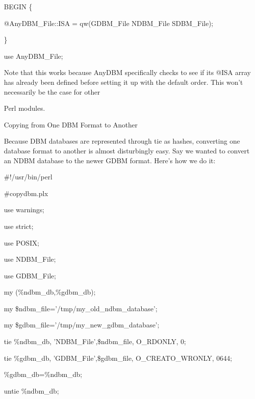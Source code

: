 \documentclass[a4paper,11pt]{book}
\begin{document}
\noindent 

\noindent BEGIN \{

\noindent @AnyDBM\_File::ISA = qw(GDBM\_File NDBM\_File SDBM\_File);

\noindent \}

\noindent use AnyDBM\_File;

\noindent 

\noindent Note that this works because  AnyDBM specifically  checks  to  see  if  its @ISA array  has already  been defined  before  setting  it up with  the  default  order.  This  won't  necessarily  be  the case  for other

\noindent Perl modules.

\noindent 

\noindent Copying from One DBM Format to Another

\noindent 

\noindent Because DBM databases are represented through tie as hashes, converting one database format to another is almost disturbingly easy. Say we wanted to convert an NDBM database to the newer GDBM format. Here's how we do it:

\noindent 

\noindent 

\noindent \#!/usr/bin/perl

\noindent \#copydbm.plx

\noindent use warnings;

\noindent use strict;

\noindent use POSIX;

\noindent use NDBM\_File;

\noindent use GDBM\_File;

\noindent 

\noindent my (\%ndbm\_db,\%gdbm\_db);

\noindent my \$ndbm\_file='/tmp/my\_old\_ndbm\_database';

\noindent my \$gdbm\_file='/tmp/my\_new\_gdbm\_database';

\noindent 

\noindent tie \%ndbm\_db, 'NDBM\_File',\$ndbm\_file, O\_RDONLY, 0;

\noindent tie \%gdbm\_db, 'GDBM\_File',\$gdbm\_file, O\_CREAT\textbar O\_WRONLY, 0644;

\noindent 

\noindent \%gdbm\_db=\%ndbm\_db;

\noindent 

\noindent untie \%ndbm\_db;
\end{document}
